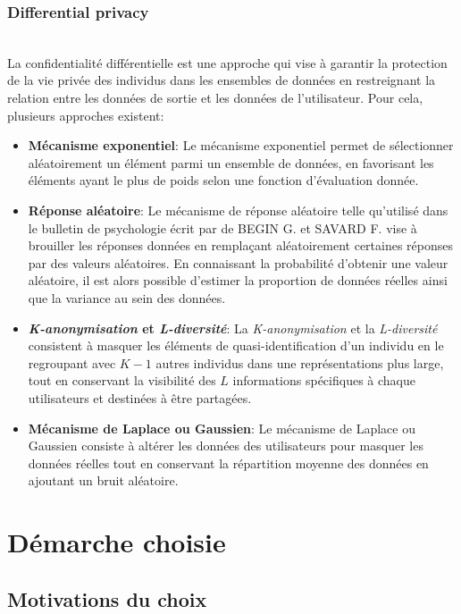 \documentclass{article}
\begin{document}
\subsubsection{Differential privacy}
$ $\\
La confidentialité différentielle est une approche qui vise à garantir la protection de la vie privée des individus dans les ensembles de données en restreignant la relation entre les données de sortie et les données de l'utilisateur.
Pour cela, plusieurs approches existent:\\
\begin{itemize}
    \item \textbf{Mécanisme exponentiel}: Le mécanisme exponentiel \cite{programming_dp} permet de sélectionner aléatoirement un élément parmi un ensemble de données, en favorisant les éléments ayant le plus de poids selon une fonction d'évaluation donnée.
    \item \textbf{Réponse aléatoire}: Le mécanisme de réponse aléatoire telle qu'utilisé dans le bulletin de psychologie écrit par de BEGIN G. et SAVARD F. \cite{psychologie} vise à brouiller les réponses données en remplaçant aléatoirement certaines réponses par des valeurs aléatoires.
          En connaissant la probabilité d'obtenir une valeur aléatoire, il est alors possible d'estimer la proportion de données réelles ainsi que la variance au sein des données.
    \item \textbf{\emph{K-anonymisation} et \emph{L-diversité}}: La \emph{K-anonymisation}\cite{kanonymisation} et la \emph{L-diversité} consistent à masquer les éléments de quasi-identification d'un
          individu en le regroupant avec $K-1$ autres individus dans une représentations plus large, tout en conservant la visibilité des $L$ informations spécifiques à chaque utilisateurs et destinées à être partagées.
    \item \textbf{Mécanisme de Laplace ou Gaussien}: Le mécanisme de Laplace ou Gaussien \cite{laplace&gauss} consiste à altérer les données des utilisateurs pour masquer les données réelles tout en conservant la répartition moyenne des données en ajoutant un bruit aléatoire.
\end{itemize}

\section{Démarche choisie}
\subsection{Motivations du choix}
\end{document}
